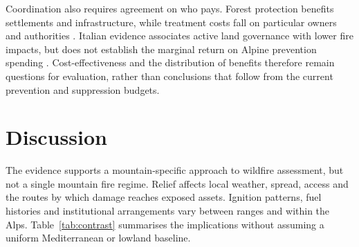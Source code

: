 \documentclass[11pt,a4paper]{article}
\begin{document}
Coordination also requires agreement on who pays. Forest protection benefits settlements and infrastructure, while treatment costs fall on particular owners and authorities \citep{accastello_asforesee_2019, moos_climate_2021}. Italian evidence associates active land governance with lower fire impacts, but does not establish the marginal return on Alpine prevention spending \citep{spadoni_active_2023}. Cost-effectiveness and the distribution of benefits therefore remain questions for evaluation, rather than conclusions that follow from the current prevention and suppression budgets.

\section{Discussion}
\label{sec:discussion}

The evidence supports a mountain-specific approach to wildfire assessment, but not a single mountain fire regime. Relief affects local weather, spread, access and the routes by which damage reaches exposed assets. Ignition patterns, fuel histories and institutional arrangements vary between ranges and within the Alps. Table~\ref{tab:contrast} summarises the implications without assuming a uniform Mediterranean or lowland baseline.
\end{document}
